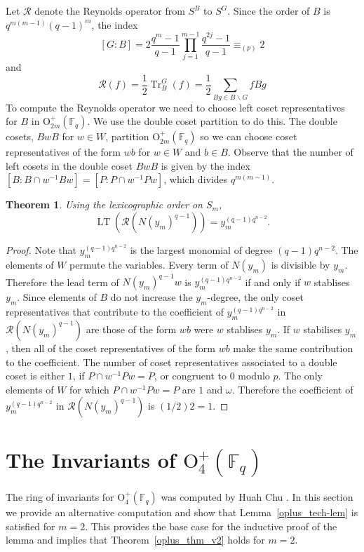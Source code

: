 \documentclass{amsart}
\newcommand{\field}{\mathbb{F}}
\newcommand{\orthp}[2]{{{\text{O}^{+}_{{#1}}(\field_{#2})}}}
\newcommand{\R}{\mathcal{R}}
\newtheorem{thm}[subsection]{Theorem}
\DeclareMathOperator{\lt}{LT}
\DeclareMathOperator{\tr}{Tr}
\begin{document}
Let $\R$ denote the Reynolds operator from $S^B$ to $S^G$.
Since the order of $B$ is $q^{m(m-1)}(q-1)^m$, the index
$$[G:B]=
2\frac{q^m-1}{q-1}\prod_{j=1}^{m-1}\frac{q^{2j}-1}{q-1}
\equiv_{(p)} 2$$
and $$\R(f)=\frac{1}{2}\tr_B^G(f)
=\frac{1}{2}\sum_{Bg\in B\backslash G} fBg$$
To compute the Reynolds operator we need to choose left coset representatives for $B$ in $\orthp{2m}{q}$.
We use the double coset partition to do this. 
The double cosets, $BwB$ for $w\in W$, partition $\orthp{2m}{q}$ so we can choose coset representatives of the form $wb$ for $w\in W$ and $b\in B$. Observe that the number of left cosets in the double coset
$BwB$ is given by the index 
$[B:B\cap w^{-1}Bw]=[P:P\cap w^{-1}Pw]$,
which divides $q^{m(m-1)}$.

\begin{thm} \label{ren_thm} Using the lexicographic order on $S_m$, 
$$\lt\left(\R(N(y_m)^{q-1})\right)=y_m^{(q-1)q^{n-2}}.$$
\end{thm} 

\begin{proof}
Note that $y_m^{(q-1)q^{n-2}}$ is the largest monomial of 
degree $(q-1)q^{n-2}$.
The elements of $W$ permute the variables. Every term of $N(y_m)$ is divisible by $y_m$. Therefore the lead term of $N(y_m)^{q-1}w$ is
$y_m^{(q-1)q^{n-2}}$ if and only if $w$ stablises $y_m$. Since elements of $B$ do not increase the $y_m$-degree, the only coset representatives that contribute to the coefficient of
$y_m^{(q-1)q^{n-2}}$ in $\R(N(y_m)^{q-1})$ are those of the form $wb$ were $w$ stablises $y_m$.
If $w$ stabilises $y_m$, then all of the coset representatives of the form $wb$ make the same contribution to the coefficient. The number of coset representatives associated to a double coset
is either $1$, if $P\cap w^{-1}Pw=P$, or congruent  to $0$ modulo $p$.
The only elements of $W$ for which $P\cap w^{-1}Pw=P$ are $1$ and $\omega$.
Therefore the coefficient of $y_m^{(q-1)q^{n-2}}$ in $\R(N(y_m)^{q-1})$ is $(1/2)2=1$.
\end{proof}


\section{The Invariants of \texorpdfstring{$\orthp{4}{q}$}{}}\label{base_case}

The ring of invariants for $\orthp{4}{q}$ was computed by
Huah Chu \cite{chu-polyinvorth:01}. 
In this section we provide an alternative computation and show that
Lemma~\ref{oplus_tech-lem} is satisfied for $m=2$.  This provides the base case for the inductive proof of the lemma and implies that Theorem~\ref{oplus_thm_v2} holds for $m=2$.
\end{document}
